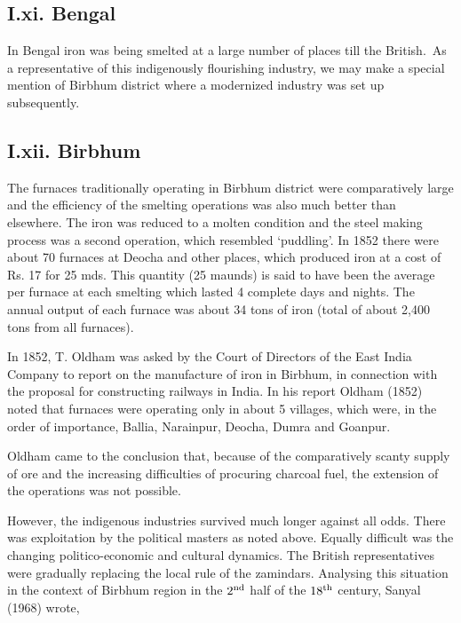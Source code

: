 \vspace{-.3cm}

\subsection*{I.xi.  Bengal}\label{subsection-11}

\vspace{-.2cm}

In Bengal iron was being smelted at a large number of places till the British.~As a representative of this indigenously flourishing industry, we may make a special mention of Birbhum district where a modernized industry was set up subsequently.

\vspace{-.3cm}

\subsection*{I.xii. Birbhum}\label{subsection-12}

\vspace{-.2cm}

The furnaces traditionally operating in Birbhum district were comparatively large and the efficiency of the smelting operations was also much better than elsewhere.  The iron was reduced to a molten condition and the steel making process was a second operation, which resembled `puddling'.  In 1852 there were about 70 furnaces at Deocha and other places, which produced iron at a cost of Rs. 17 for 25 mds.  This quantity (25 maunds) is said to have been the average per furnace at each smelting which lasted 4 complete days and nights.   The annual output of each furnace was about 34 tons of iron (total of about 2,400 tons from all furnaces).

In 1852, T. Oldham was asked by the Court of Directors of the East India Company to report on the manufacture of iron in Birbhum, in connection with the proposal for constructing railways in India. In his report Oldham (1852) noted that furnaces were operating only in about 5 villages, which were, in the order of importance, Ballia, Narainpur, Deocha, Dumra and Goanpur.

\newpage

Oldham came to the conclusion that, because of the comparatively scanty supply of ore and the increasing difficulties of procuring charcoal fuel, the extension of the operations was not possible.

However, the indigenous industries survived much longer against all odds.  There was exploitation by the political masters as noted above.  Equally difficult was the changing politico-economic and cultural dynamics.  The British representatives were gradually replacing the local rule of the zamindars.  Analysing this situation in the context of Birbhum region in the $2^{\rm nd}$ half of the $18^{\rm th}$ century, Sanyal (1968) wrote, 


